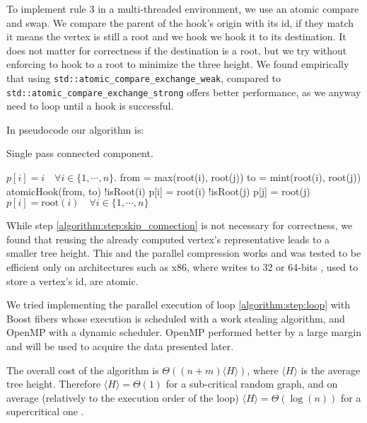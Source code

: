 To implement rule $3$ in a multi-threaded environment, we use an atomic compare and swap.
We compare the parent of the hook's origin with its id, if they match it means the vertex is still a root and we
hook we hook it to its destination. It does not matter for correctness if the destination is a root, but we try without enforcing to
hook to a root to minimize the three height.
We found empirically that using \verb|std::atomic_compare_exchange_weak|,
compared to \verb|std::atomic_compare_exchange_strong| offers better performance, as we anyway need to loop until a hook is successful.


In pseudocode our algorithm is:

\begin{algorithm}[H]
    \caption{Single pass connected component.}
    \label{algorithm:cc2}
    \begin{algorithmic}[1]
        \State $p[i] = i \quad \forall i \in \{1,\cdots, n\}$. %
          \label{algorithm:step:loop}
                \State from = max(root(i), root(j))
                \State to = mint(root(i), root(j))
                \State  atomicHook(from, to)
        \EndWhile
        \State  \kif !isRoot(i) \kthen p[i] = root(i) \label{algorithm:step:skip_connection}
        \State  \kif !isRoot(j) \kthen p[j] = root(j)
        \EndFor
        \State $p[i] = \text{root}(i) \quad \forall i \in \{1,\cdots, n\}$ 
        \EndProcedure
    \end{algorithmic}
\end{algorithm}

While step \ref{algorithm:step:skip_connection} is not necessary for correctness, we found that
reusing the already computed vertex's representative leads to a smaller tree height. This and the parallel compression works and was tested to
be efficient only on architectures such as x86, where writes to 32 or 64-bits , used to store a vertex's id, are atomic.

We tried implementing the parallel execution of loop \ref{algorithm:step:loop} with  Boost fibers \cite{Boost}
whose execution is scheduled with a work stealing algorithm, and OpenMP with a dynamic scheduler.
OpenMP performed better by a large margin and will be used to  acquire the data presented later.

The overall cost of the algorithm is $\Theta((n + m)\langle H \rangle)$, where $\langle H \rangle$ is
the average tree height. Therefore $\langle H \rangle = \Theta(1)$ for a sub-critical random graph, and on average (relatively to the execution order of the loop) $\langle H \rangle = \Theta(\log(n))$
for a supercritical one \cite{RandomGraph}.

